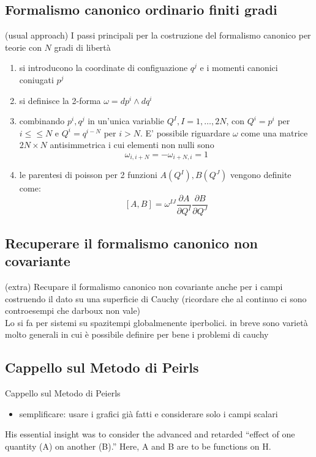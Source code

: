 \documentclass[Main]{subfiles}
\begin{document}
	\subsection{Formalismo canonico ordinario finiti gradi}
				(usual approach) I passi principali per la costruzione del formalismo canonico per teorie con $N$ gradi di libertà
						\begin{enumerate}
							\item si introducono la coordinate di configuazione $q^j$ e i momenti canonici coniugati $p^j$
							\item si definisce la 2-forma $\omega = dp^i \wedge dq^i$
							\item combinando $p^i,q^j$ in un'unica variablie $Q^I , I = 1,\ldots,2N$, con $Q^i=p^i$ per $i\leq\leq N$ e $Q^i= q^{i-N}$ per $i>N$. E' possibile riguardare $\omega$ come una matrice $2N \times N$  antisimmetrica i cui elementi non nulli sono
								\begin{displaymath}
									\omega_{i , i+N} = -\omega_{i+N,i} = 1
								\end{displaymath}
							\item le parentesi di poisson per 2 funzioni $A(Q^I) , B(Q^J)$ vengono definite come:
								\begin{displaymath}
									\left[ A , B \right] = \omega^{I J} \frac{\partial A}{\partial Q^I} \frac{\partial B}{\partial Q^J}					
								\end{displaymath}
						\end{enumerate}

	\subsection{Recuperare il formalismo canonico non covariante}
			(extra) Recupare il formalismo canonico non covariante anche per i campi costruendo il dato su una superficie di Cauchy (ricordare che al continuo ci sono controesempi che darboux non vale)
			\\
			Lo si fa per sistemi su spazitempi globalmenente iperbolici. in breve sono varietà molto generali in cui è possibile definire per bene i problemi di cauchy
			\\

\subsection{Cappello sul Metodo di Peirls}
{Cappello sul Metodo di Peierls }
			\begin{itemize}
				\item semplificare: usare i grafici già fatti e considerare solo i campi scalari
			\end{itemize}
			His essential insight was to consider the advanced and retarded “effect of one quantity (A) on another (B).” Here, A and B are to
be functions on H. 
\end{document}
